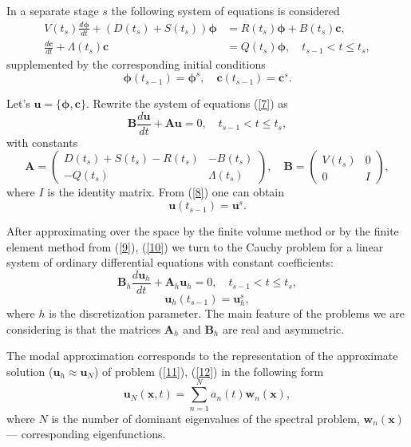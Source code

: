 \documentclass[authoryear]{elsarticle}
\begin{document}
In a separate stage $s$ the following system of equations is considered
\begin{equation}\label{7}
\begin{split}
V(t_s) \frac{d \bm \phi}{d t} + (D(t_s)+S(t_s)) \bm \phi &= R(t_s) \bm \phi + B(t_s)\bm c,
\\
\frac{d \bm c}{d t} + \Lambda(t_s)\bm c &= Q(t_s) \bm \phi, 
\quad t_{s-1} < t \leq t_s,
\end{split}
\end{equation} 
supplemented by the corresponding initial conditions 
\begin{equation}\label{8}
 \bm \phi(t_{s-1}) = \bm \phi^s,
 \quad   \bm c(t_{s-1}) = \bm c^s .
\end{equation} 

Let's $\bm u = \{\bm \phi, \bm c\}$. Rewrite the system of equations (\ref{7}) as
\begin{equation}\label{9}
 \bm B \frac{d \bm u}{d t} + \bm A \bm u = 0,
 \quad t_{s-1} < t \leq t_s,
\end{equation} 
with constants
\[
 \bm A = 
 \begin{pmatrix}
 D(t_s)+S(t_s) - R(t_s) &  - B(t_s) \\
 - Q(t_s) & \Lambda(t_s) 
 \end{pmatrix} ,
 \quad  \bm B = 
 \begin{pmatrix}
 V(t_s) & 0 \\
 0 & I 
 \end{pmatrix} ,
\] 
where $I$ is the identity matrix. From (\ref{8}) one can obtain
\begin{equation}\label{10}
 \bm u(t_{s-1}) = \bm u^s .
\end{equation} 

After approximating over the space by the finite volume method or by the finite element method from (\ref{9}), (\ref{10}) 
we turn to the Cauchy problem for a linear system of ordinary differential equations with constant coefficients:
\begin{equation}\label{11}
 \bm B_h \frac{d \bm u_h}{d t} + \bm A_h \bm u_h = 0,
 \quad t_{s-1} < t \leq t_s,
\end{equation}   
\begin{equation}\label{12}
 \bm u_h(t_{s-1}) = \bm u_h^s ,
\end{equation} 
where $h$ is the discretization parameter. The main feature of the problems we are considering is that the matrices $\bm A_h$ and $\bm B_h$ 
are real and asymmetric.

The modal approximation corresponds to the representation of the approximate solution  ($\bm u_h \approx \bm u_N$) of problem   (\ref{11}), (\ref{12}) in the following form
\begin{equation}\label{13}
 \bm u_N(\bm x, t) =
 \sum_{n=1}^{N} a_n(t) \bm w_n(\bm x),
\end{equation} 
where $N$ is the number of dominant eigenvalues of the spectral problem, 
$\bm w_n(\bm x)$ --- corresponding eigenfunctions.
\end{document}
